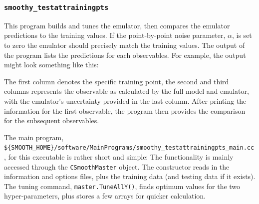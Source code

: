 \documentclass[UserManual.tex]{subfiles}
\begin{document}
\begin{sloppypar}
\subsubsection{{\tt smoothy\_testattrainingpts}}
This program builds and tunes the emulator, then compares the emulator predictions to the training values. If the point-by-point noise parameter, $\alpha$, is set to zero the emulator should precisely match the training values. The output of the program lists the predictions for each observables. For example, the output might look something like this:
\vspace*{-8pt}{\tt \begin{Verbatim}[commandchars=\\\{\}]
% \textcolor{darkred}{smoothy_testattrainingpts}
 ------ first_observable_name -------------
 ---- Lambda=3.070954, SigmaA=93.242332
 - itrain --- Y_full     Y_emulator    Sigma_emulator
  0 Y[0]= 4.385e+01 =?  4.385e+01  +/-  2.41322e-05
  1 Y[0]= 9.320e+01 =?  9.320e+01  +/-  1.53834e-05
  2 Y[0]= 4.381e+01 =?  4.381e+01  +/-  2.57861e-05
  .
\end{Verbatim}
}\vspace*{-8pt}

The first column denotes the specific training point, the second and third columns represents the observable as calculated by the full model and emulator, with the emulator's uncertainty provided in the last column. After printing the information for the first observable, the program then provides the comparison for the subsequent observables.

The main program,\\{\tt \$\{SMOOTH\_HOME\}/software/MainPrograms/smoothy\_testattrainingpts\_main.cc}, for this executable is rather short and simple:
\vspace*{-8pt}
The functionality is mainly accessed through the {\tt CSmoothMaster} object. The constructor reads in the information and options files, plus the training data (and testing data if it exists). The tuning command, {\tt master.TuneAllY()}, finds optimum values for the two hyper-parameters, plus stores a few arrays for quicker calculation.


\end{sloppypar}
\end{document}
